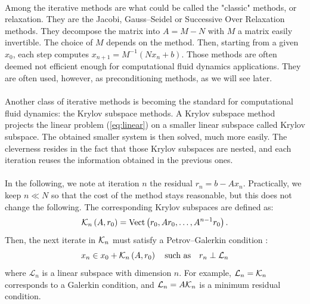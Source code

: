       \paragraph{}
      Among the iterative methods are what could be called the "classic" methods, or relaxation.
      They are the Jacobi, Gauss--Seidel or Successive Over Relaxation methods.
      They decompose the matrix into $A = M - N$ with $M$ a matrix easily invertible.
      The choice of $M$ depends on the method.
      Then, starting from a given $x_0$, each step computes $x_{n+1} = M^{-1} \left( N x_n + b \right)$.
      Those methods are often deemed not efficient enough for computational fluid dynamics applications.
      They are often used, however, as preconditioning methods, as we will see later.

      \paragraph{}
      Another class of iterative methods is becoming the standard for computational fluid dynamics: the Krylov subspace methods.
      A Krylov subspace method projects the linear problem (\ref{eq:linear}) on a smaller linear subspace called Krylov subspace.
      The obtained smaller system is then solved, much more easily.
      The cleverness resides in the fact that those Krylov subspaces are nested, and each iteration reuses the information obtained in the previous ones.

      \paragraph{}
      In the following, we note at iteration $n$ the residual $r_n = b - A x_n$.
      Practically, we keep $n \ll N$ so that the cost of the method stays reasonable, but this does not change the following.
      The corresponding Krylov subspaces are defined as:
  		\begin{equation}
  			\krylov[A, r_0]{n} = \operatorname{Vect}\left( r_0, A r_0, \dots, A^{n-1} r_0 \right) .
  		\end{equation}
      Then, the next iterate in $\krylov{n}$ must satisfy a Petrov--Galerkin condition \cite{SimonciniSzyld2007}:
  		\begin{equation}
  			x_n \in x_0 + \krylov[A, r_0]{n} \quad \textrm{such as} \quad r_n \perp \mathcal{L}_n
  		\end{equation}
      where $\mathcal{L}_n$ is a linear subspace with dimension $n$.
      For example, $\mathcal{L}_n = \krylov{n}$ corresponds to a Galerkin condition, and $\mathcal{L}_n = A \krylov{n}$ is a minimum residual condition.

